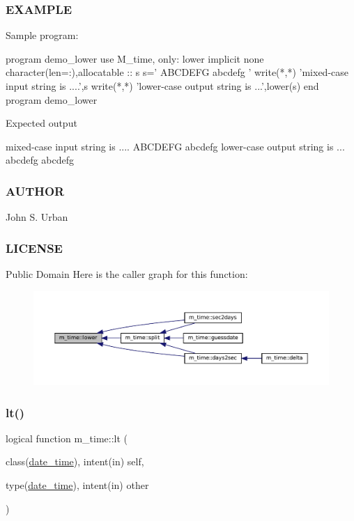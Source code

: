 \subsubsection*{E\+X\+A\+M\+P\+LE}

\begin{DoxyVerb}Sample program:

 program demo_lower
 use M_time, only: lower
 implicit none
 character(len=:),allocatable  :: s
    s=' ABCDEFG abcdefg '
    write(*,*) 'mixed-case input string is ....',s
    write(*,*) 'lower-case output string is ...',lower(s)
 end program demo_lower

Expected output

   mixed-case input string is .... ABCDEFG abcdefg
   lower-case output string is ... abcdefg abcdefg
\end{DoxyVerb}
 \subsubsection*{A\+U\+T\+H\+OR}

John S. Urban \subsubsection*{L\+I\+C\+E\+N\+SE}

Public Domain Here is the caller graph for this function\+:\nopagebreak
\begin{figure}[H]
\begin{center}
\leavevmode
\includegraphics[width=350pt]{namespacem__time_a96597ff2f2eab2ede14e3a63bd49254a_icgraph}
\end{center}
\end{figure}
\mbox{\label{namespacem__time_a2cc7f6c40c8ef5aeef08cd51912987d7}} 
\subsubsection{\texorpdfstring{lt()}{lt()}}
{\footnotesize\ttfamily logical function m\+\_\+time\+::lt (\begin{DoxyParamCaption}\item[{class(\mbox{\hyperlink{structm__time_1_1date__time}{date\+\_\+time}}), intent(in)}]{self,  }\item[{type(\mbox{\hyperlink{structm__time_1_1date__time}{date\+\_\+time}}), intent(in)}]{other }\end{DoxyParamCaption})\hspace{0.3cm}{\ttfamily [private]}}



